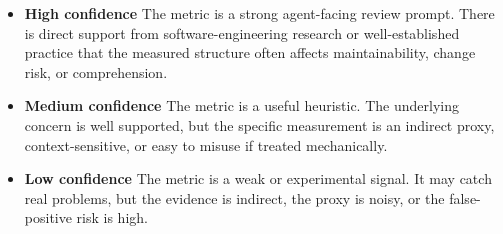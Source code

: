\documentclass[11pt]{article}
\begin{document}
\begin{itemize}
\item \textbf{High confidence} The metric is a strong agent-facing review
prompt. There is direct support from software-engineering research or well-established
practice that the measured structure often affects maintainability, change risk,
or comprehension.
\item \textbf{Medium confidence} The metric is a useful heuristic. The
underlying concern is well supported, but the specific measurement is an
indirect proxy, context-sensitive, or easy to misuse if treated mechanically.
\item \textbf{Low confidence} The metric is a weak or experimental signal. It
may catch real problems, but the evidence is indirect, the proxy is noisy, or
the false-positive risk is high.
\end{itemize}
\end{document}

